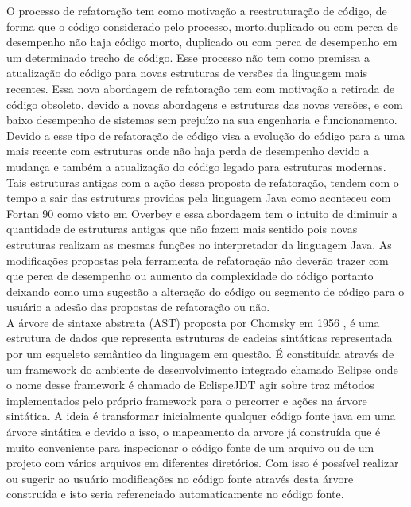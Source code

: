 O processo de refatoração \cite{Schaefer:2010:SIR:1932682.1869485} tem como motivação a reestruturação de código, de forma que o código considerado pelo processo, morto,duplicado ou com perca de desempenho não haja código morto, duplicado ou com perca de desempenho em um determinado trecho de código. Esse processo não tem como premissa a atualização do código para novas estruturas de versões da linguagem mais recentes. Essa nova abordagem de refatoração tem com motivação a retirada de código obsoleto, devido a novas abordagens e estruturas das novas versões, e com baixo desempenho de sistemas sem prejuízo na sua engenharia e funcionamento.\\

Devido a esse tipo de refatoração de código visa a evolução do código para a uma mais recente com estruturas onde não haja perda de desempenho devido a mudança e também a atualização do código legado para estruturas modernas. Tais estruturas antigas com a ação dessa proposta de refatoração, tendem com o tempo a sair das estruturas providas pela linguagem Java como aconteceu com Fortan 90 como visto em Overbey  \cite{Overbey:2009:RLR:1639949.1640127} e essa abordagem tem o intuito de diminuir a quantidade de estruturas antigas que não fazem mais sentido pois novas estruturas realizam as mesmas funções no interpretador da linguagem Java. As modificações propostas pela ferramenta de refatoração não deverão trazer com que perca de desempenho ou aumento da complexidade do código portanto deixando como uma sugestão a alteração do código ou segmento de código para o usuário a adesão das propostas de refatoração ou não.\\

A árvore de sintaxe abstrata (AST) proposta por Chomsky em 1956 \cite{chomsky1956three},  é uma estrutura de dados que representa estruturas de cadeias sintáticas representada por um esqueleto semântico da linguagem em questão. É constituída através de um framework do ambiente de desenvolvimento integrado chamado Eclipse onde o nome desse framework é chamado de EclispeJDT agir sobre traz métodos implementados pelo próprio framework para o percorrer e ações na árvore sintática. A ideia é transformar inicialmente qualquer código fonte java em uma árvore sintática e devido a isso, o mapeamento da arvore já construída que é muito conveniente para inspecionar o código fonte de um arquivo ou de um projeto com vários arquivos em diferentes diretórios. Com isso é possível realizar ou sugerir ao usuário modificações no código fonte através desta árvore construída e isto seria referenciado automaticamente no código fonte.\\

